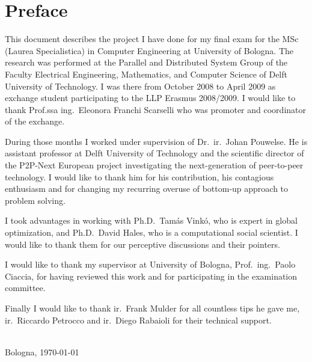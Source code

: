 \chapter{\label{cha:Preface}Preface}

This document describes the project I have done for my final exam for the MSc (Laurea Specialistica) in Computer Engineering at University of Bologna. The research was performed at the Parallel and Distributed System Group of the Faculty Electrical Engineering, Mathematics, and Computer Science of Delft University of Technology. I was there from October 2008 to April 2009 as exchange student participating to the LLP Erasmus 2008/2009. I would like to thank Prof.ssa ing.~Eleonora Franchi Scarselli who was promoter and coordinator of the exchange.

During those months I worked under supervision of Dr.\ ir.~Johan Pouwelse. He is assistant professor at Delft University of Technology and the scientific director of the P2P-Next European project investigating the next-generation of peer-to-peer technology. I would like to thank him for his contribution, his contagious enthusiasm and for changing my recurring overuse of bottom-up approach to problem solving.

I took advantages in working with Ph.D.~Tam\'{a}s Vink\'{o}, who is expert in global optimization, and Ph.D.~David Hales, who is a computational social scientist. I would like to thank them for our perceptive discussions and their pointers.%

I would like to thank my supervisor at University of Bologna, Prof.\ ing.~Paolo Ciaccia, for having reviewed this work and for participating in the examination committee.

Finally I would like to thank ir.~Frank Mulder for all countless tips he gave me, ir.~Riccardo Petrocco and ir.~Diego Rabaioli for their technical support.

\vskip1cm
\begin{flushright}
\theauthor\\
Bologna, \today\\
\end{flushright}

